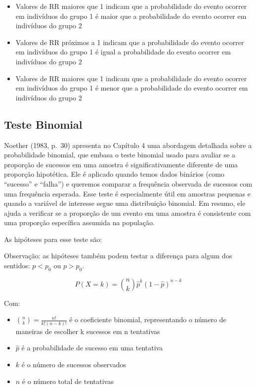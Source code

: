 \documentclass[
  portuguese,
]{estat/estat}
\begin{document}
\begin{itemize}
    \item Valores de RR maiores que 1 indicam que a probabilidade do evento ocorrer em indivíduos do grupo 1 é maior que a probabilidade do evento ocorrer em indivíduos do grupo 2
    
    \item Valores de RR próximos a 1 indicam que a probabilidade do evento ocorrer em indivíduos do grupo 1 é igual a probabilidade do evento ocorrer em indivíduos do grupo 2
    
    \item Valores de RR maiores que 1 indicam que a probabilidade do evento ocorrer em indivíduos do grupo 1 é menor que a probabilidade do evento ocorrer em indivíduos do grupo 2
\end{itemize}

\subsection{Teste Binomial}\label{teste-binomial}

Noether (1983, p.~30) apresenta no Capítulo 4 uma abordagem detalhada
sobre a probabilidade binomial, que embasa o teste binomial usado para
avaliar se a proporção de sucessos em uma amostra é significativamente
diferente de uma proporção hipotética. Ele é aplicado quando temos dados
binários (como ``sucesso'' e ``falha'') e queremos comparar a frequência
observada de sucessos com uma frequência esperada. Esse teste é
especialmente útil em amostras pequenas e quando a variável de interesse
segue uma distribuição binomial. Em resumo, ele ajuda a verificar se a
proporção de um evento em uma amostra é consistente com uma proporção
específica assumida na população.

As hipóteses para esse teste são:


Observação: as hipóteses também podem testar a diferença para algum dos
sentidos: \(p < p_{0}\) ou \(p > p_{0}\).

\[
P(X = k) = \binom{n}{k} \hat{p}^k (1 - \hat{p})^{n - k}
\]

Com:

\begin{itemize}
    \item $\binom{n}{k} = \frac{n!}{k!(n-k)!}$ é o coeficiente binomial, representando o número de maneiras de escolher k sucessos em n tentativas
    \item $\hat{p}$ é a probabilidade de sucesso em uma tentativa
    \item $k$ é o número de sucessos observados
    \item $n$ é o número total de tentativas
\end{itemize}
\end{document}
